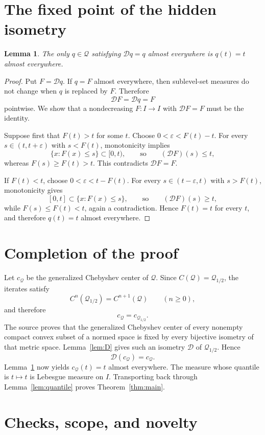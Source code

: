 \documentclass[11pt]{article}
\newtheorem{lemma}[theorem]{Lemma}
\newcommand{\Q}{\mathcal Q}
\newcommand{\D}{\mathcal D}
\begin{document}
\section{The fixed point of the hidden isometry}

\begin{lemma}\label{lem:fixed}
The only $q\in\Q$ satisfying $\D q=q$ almost everywhere is
$q(t)=t$ almost everywhere.
\end{lemma}

\begin{proof}
Put $F=\D q$.  If $q=F$ almost everywhere, then sublevel-set measures do
not change when $q$ is replaced by $F$.  Therefore
\[
 \D F=\D q=F
\]
pointwise.  We show that a nondecreasing $F:I\to I$ with $\D F=F$ must be
the identity.

Suppose first that $F(t)>t$ for some $t$.  Choose
$0<\varepsilon<F(t)-t$.  For every
$s\in(t,t+\varepsilon)$ with $s<F(t)$, monotonicity implies
\[
 \{x:F(x)\leq s\}\subset[0,t),
 \qquad\text{so}\qquad
 (\D F)(s)\leq t,
\]
whereas $F(s)\geq F(t)>t$.  This contradicts $\D F=F$.

If $F(t)<t$, choose $0<\varepsilon<t-F(t)$.  For every
$s\in(t-\varepsilon,t)$ with $s>F(t)$, monotonicity gives
\[
 [0,t]\subset\{x:F(x)\leq s\},
 \qquad\text{so}\qquad
 (\D F)(s)\geq t,
\]
while $F(s)\leq F(t)<t$, again a contradiction.  Hence $F(t)=t$ for every
$t$, and therefore $q(t)=t$ almost everywhere.
\end{proof}

\section{Completion of the proof}

Let $c_\Q$ be the generalized Chebyshev center of $\Q$.  Since
$C(\Q)=\Q_{1/2}$, the iterates satisfy
\[
 C^n(\Q_{1/2})=C^{n+1}(\Q)\qquad(n\geq0),
\]
and therefore
\[
 c_\Q=c_{\Q_{1/2}}.
\]
The source proves that the generalized Chebyshev center of every nonempty
compact convex subset of a normed space is fixed by every bijective isometry
of that metric space.  Lemma~\ref{lem:D} gives such an isometry $\D$ of
$\Q_{1/2}$.  Hence
\[
 \D(c_\Q)=c_\Q.
\]
Lemma~\ref{lem:fixed} now yields $c_\Q(t)=t$ almost everywhere.  The measure
whose quantile is $t\mapsto t$ is Lebesgue measure on $I$.  Transporting back
through Lemma~\ref{lem:quantile} proves Theorem~\ref{thm:main}.

\section{Checks, scope, and novelty}
\end{document}
